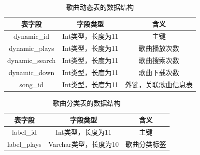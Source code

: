 \documentclass[UTF8,14pt]{article}
\numberwithin{figure}{subsubsection}
\numberwithin{table}{subsubsection}
\begin{document}
\vspace*{-0.5cm}
\begin{table}[H]
	\centering
	\setlength{\abovecaptionskip}{0.cm}
	\setlength{\belowcaptionskip}{0.cm}
	\begin{tabular}{|c|c|c|}
		\hline
		表字段          & 字段类型          & 含义                 \\ \hline
		dynamic\_id     & Int类型，长度为11 & 主键                 \\ \hline
		dynamic\_plays  & Int类型，长度为11 & 歌曲播放次数         \\ \hline
		dynamic\_search & Int类型，长度为11 & 歌曲搜索次数         \\ \hline
		dynamic\_down   & Int类型，长度为11 & 歌曲下载次数         \\ \hline
		song\_id        & Int类型，长度为11 & 外键，关联歌曲信息表 \\ \hline
	\end{tabular}
	\caption{歌曲动态表的数据结构}
\end{table}
\vspace*{-0.5cm}
\begin{table}[H]
	\centering
	\setlength{\abovecaptionskip}{0.cm}
	\setlength{\belowcaptionskip}{0.cm}
	\begin{tabular}{|c|c|c|}
		\hline
		表字段       & 字段类型              & 含义         \\ \hline
		label\_id    & Int类型，长度为11     & 主键         \\ \hline
		label\_plays & Varchar类型，长度为10 & 歌曲分类标签 \\ \hline
	\end{tabular}
	\caption{歌曲分类表的数据结构}
\end{table}
\vspace*{-0.5cm}
\end{document}
